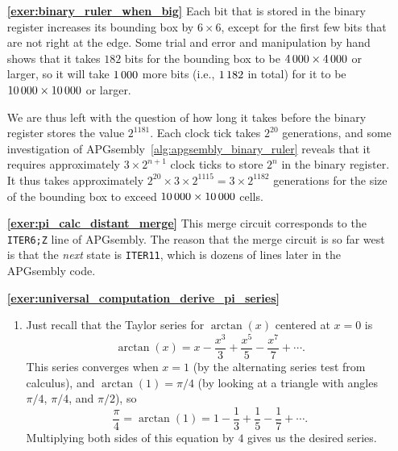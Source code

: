 \begin{multicols}{2}
	\begin{itemize}[leftmargin=0em]
		\item[\bf\color{ocre}\sffamily\ref{exer:binary_ruler_when_big}] Each bit that is stored in the binary register increases its bounding box by $6 \times 6$, except for the first few bits that are not right at the edge. Some trial and error and manipulation by hand shows that it takes $182$ bits for the bounding box to be $4{\,}000 \times 4{\,}000$ or larger, so it will take $1{\,}000$ more bits (i.e., $1{\,}182$ in total) for it to be $10{\,}000 \times 10{\,}000$ or larger.
		
		We are thus left with the question of how long it takes before the binary register stores the value $2^{1181}$. Each clock tick takes $2^{20}$ generations, and some investigation of APGsembly~\ref{alg:apgsembly_binary_ruler} reveals that it requires approximately $3 \times 2^{n+1}$ clock ticks to store $2^n$ in the binary register. It thus takes approximately $2^{20} \times 3 \times 2^{1115} = 3 \times 2^{1182}$ generations for the size of the bounding box to exceed $10{\,}000 \times 10{\,}000$ cells.\\
		
		
		\item[\bf\color{ocre}\sffamily\ref{exer:pi_calc_distant_merge}] This merge circuit corresponds to the \texttt{ITER6;Z} line of APGsembly. The reason that the merge circuit is so far west is that the \emph{next} state is \texttt{ITER11}, which is dozens of lines later in the APGsembly code.\\
		
		
		\item[\bf\color{ocre}\sffamily\ref{exer:universal_computation_derive_pi_series}] \begin{enumerate}[leftmargin=1.5em,label=\bf\color{ocre}(\alph*)]
			\item Just recall that the Taylor series for $\arctan(x)$ centered at $x = 0$ is
			\[
			\arctan(x) = x - \frac{x^3}{3} + \frac{x^5}{5} - \frac{x^7}{7} + \cdots.
			\]
			This series converges when $x = 1$ (by the alternating series test from calculus), and $\arctan(1) = \pi/4$ (by looking at a triangle with angles $\pi/4$, $\pi/4$, and $\pi/2$), so
			\[
			\frac{\pi}{4} = \arctan(1) = 1 - \frac{1}{3} + \frac{1}{5} - \frac{1}{7} + \cdots.
			\]
			Multiplying both sides of this equation by $4$ gives us the desired series.
			

\end{enumerate}
\end{itemize}
\end{multicols}
